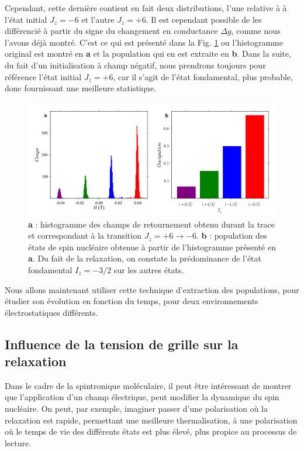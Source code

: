 Cependant, cette dernière contient en fait deux distributions, l'une relative à à l'état initial $J_z=-6$ et l'autre $J_z=+6$. Il est cependant possible de les différencié à partir du signe du changement en conductance $\Delta g$, comme nous l'avons déjà montré. C'est ce qui est présenté dans la Fig. \ref{extract_pop} ou l'histogramme original est montré en \textbf{a} et la population qui en est extraite en \textbf{b}. Dans la suite, du fait d'un initialisation à champ négatif, nous prendrons toujours pour référence l'état initial $J_z=+6$, car il s'agit de l'état fondamental, plus probable, donc fournissant une meilleure statistique.

\begin{figure}
\includegraphics[scale=0.45]{Resultats/PopState/PopState.pdf} 
\caption{\textbf{a} : histogramme des champs de retournement obtenu durant la trace et correspondant à la transition $J_z = +6 \rightarrow -6$. \textbf{b} : population des états de spin nucléaire obtenue à partir de l'histogramme présenté en \textbf{a}. Du fait de la relaxation, on constate la prédominance de l'état fondamental $I_z=-3/2$ sur les autres états.}
\label{extract_pop}
\end{figure}

Nous allons maintenant utiliser cette technique d'extraction des populations, pour étudier son évolution en fonction du temps, pour deux environnements électrostatiques différents.

\subsection{Influence de la tension de grille sur la relaxation}
Dans le cadre de la spintronique moléculaire, il peut \^etre intéressant de montrer que l'application d'un champ électrique, peut modifier la dynamique du spin nucléaire. On peut, par exemple, imaginer passer d'une polarisation où la relaxation est rapide, permettant une meilleure thermalisation, à une polarisation où le temps de vie des différents états est plus élevé, plus propice au processus de lecture.

